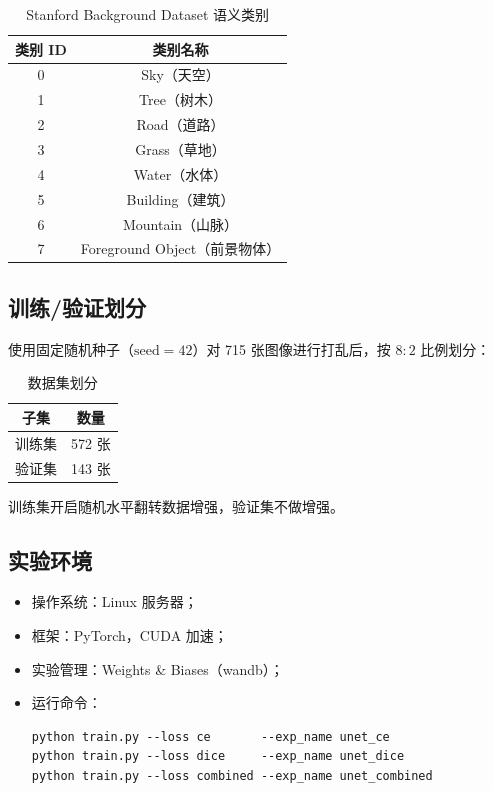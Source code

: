 \documentclass[UTF8,a4paper,12pt,fontset=fandol]{ctexart}
\begin{document}
\begin{table}[H]
\centering
\caption{Stanford Background Dataset 语义类别}
\begin{tabular}{cc}
\toprule
类别 ID & 类别名称 \\
\midrule
0 & Sky（天空） \\
1 & Tree（树木） \\
2 & Road（道路） \\
3 & Grass（草地） \\
4 & Water（水体） \\
5 & Building（建筑） \\
6 & Mountain（山脉） \\
7 & Foreground Object（前景物体） \\
\bottomrule
\end{tabular}
\end{table}

\subsection{训练/验证划分}
使用固定随机种子（$\text{seed}=42$）对 715 张图像进行打乱后，按 $8:2$ 比例划分：

\begin{table}[H]
\centering
\caption{数据集划分}
\begin{tabular}{cc}
\toprule
子集 & 数量 \\
\midrule
训练集 & 572 张 \\
验证集 & 143 张 \\
\bottomrule
\end{tabular}
\end{table}

训练集开启随机水平翻转数据增强，验证集不做增强。

\subsection{实验环境}
\begin{itemize}
    \item 操作系统：Linux 服务器；
    \item 框架：PyTorch，CUDA 加速；
    \item 实验管理：Weights \& Biases（wandb）；
    \item 运行命令：
    \begin{verbatim}
python train.py --loss ce       --exp_name unet_ce
python train.py --loss dice     --exp_name unet_dice
python train.py --loss combined --exp_name unet_combined
    \end{verbatim}
\end{itemize}
\end{document}
